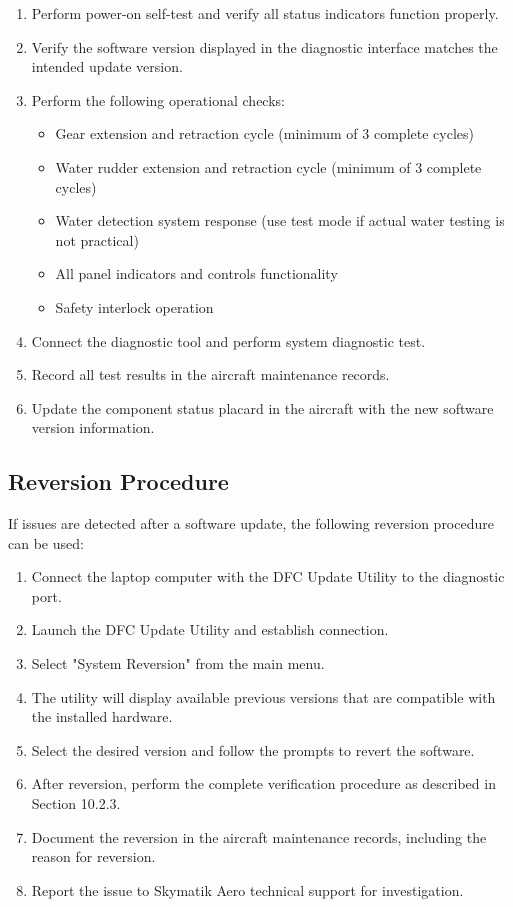 \documentclass[12pt,a4paper,twoside,openright]{book}
\begin{document}
\begin{enumerate}
    \item Perform power-on self-test and verify all status indicators function properly.
    \item Verify the software version displayed in the diagnostic interface matches the intended update version.
    \item Perform the following operational checks:
    \begin{itemize}
        \item Gear extension and retraction cycle (minimum of 3 complete cycles)
        \item Water rudder extension and retraction cycle (minimum of 3 complete cycles)
        \item Water detection system response (use test mode if actual water testing is not practical)
        \item All panel indicators and controls functionality
        \item Safety interlock operation
    \end{itemize}
    \item Connect the diagnostic tool and perform system diagnostic test.
    \item Record all test results in the aircraft maintenance records.
    \item Update the component status placard in the aircraft with the new software version information.
\end{enumerate}

\subsection{Reversion Procedure}

If issues are detected after a software update, the following reversion procedure can be used:

\begin{enumerate}
    \item Connect the laptop computer with the DFC Update Utility to the diagnostic port.
    \item Launch the DFC Update Utility and establish connection.
    \item Select "System Reversion" from the main menu.
    \item The utility will display available previous versions that are compatible with the installed hardware.
    \item Select the desired version and follow the prompts to revert the software.
    \item After reversion, perform the complete verification procedure as described in Section 10.2.3.
    \item Document the reversion in the aircraft maintenance records, including the reason for reversion.
    \item Report the issue to Skymatik Aero technical support for investigation.
\end{enumerate}
\end{document}
